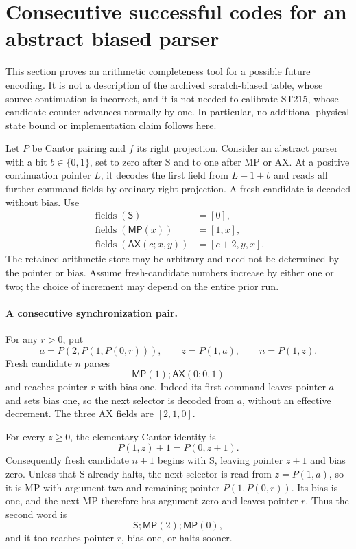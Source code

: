 \section{Consecutive successful codes for an abstract biased parser}
\label{sec:biased-parser-synchronization}

This section proves an arithmetic completeness tool for a possible future
encoding.  It is not a description of the archived scratch-biased table,
whose source continuation is incorrect, and it is not needed to calibrate
ST215, whose candidate counter advances normally by one.  In particular,
no additional physical state bound or implementation claim follows here.

Let $P$ be Cantor pairing and $f$ its right projection.  Consider an
abstract parser with a bit $b\in\{0,1\}$, set to zero after S and to one
after MP or AX.  At a positive continuation pointer $L$, it decodes the
first field from $L-1+b$ and reads all further command fields by ordinary
right projection.  A fresh candidate is decoded without bias.  Use
\[
\begin{split}
 \operatorname{fields}(\mathsf S)&=[0],\\
 \operatorname{fields}(\mathsf{MP}(x))&=[1,x],\\
 \operatorname{fields}(\mathsf{AX}(c;x,y))&=[c+2,y,x].
\end{split}
\]
The retained arithmetic store may be arbitrary and need not be determined
by the pointer or bias.  Assume fresh-candidate numbers increase by either
one or two; the choice of increment may depend on the entire prior run.

\paragraph{A consecutive synchronization pair.}
For any $r>0$, put
\[
 a=P(2,P(1,P(0,r))),\qquad z=P(1,a),\qquad n=P(1,z).
\]
Fresh candidate $n$ parses
\[
                  \mathsf{MP}(1);\mathsf{AX}(0;0,1)
\]
and reaches pointer $r$ with bias one.  Indeed its first command leaves
pointer $a$ and sets bias one, so the next selector is decoded from $a$,
without an effective decrement.  The three AX fields are $[2,1,0]$.

For every $z\ge0$, the elementary Cantor identity is
\[
                         P(1,z)+1=P(0,z+1).
\]
Consequently fresh candidate $n+1$ begins with S, leaving pointer $z+1$
and bias zero.  Unless that S already halts, the next selector is read
from $z=P(1,a)$, so it is MP with argument two and remaining pointer
$P(1,P(0,r))$.  Its bias is one, and the next MP therefore has argument
zero and leaves pointer $r$.  Thus the second word is
\[
                       \mathsf S;\mathsf{MP}(2);\mathsf{MP}(0),
\]
and it too reaches pointer $r$, bias one, or halts sooner.

